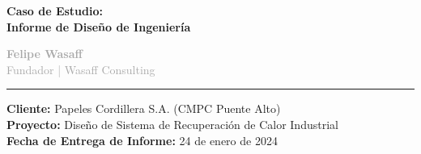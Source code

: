 \documentclass[10pt, a4paper]{article}
\begin{document}
\begin{minipage}[t]{0.65\textwidth}
    \vspace{0pt}
    \textcolor{DeepBlue}{\Huge\textbf{Caso de Estudio:}} \\
    \textcolor{OrangeAccent}{\Large\textbf{Informe de Diseño de Ingeniería}}
\end{minipage}%
\begin{minipage}[t]{0.35\textwidth}
    \vspace{0pt}
    \flushright
    \textcolor{DarkGray}{\textbf{Felipe Wasaff}} \\
    \textcolor{DarkGray}{Fundador | Wasaff Consulting}
\end{minipage}

\vspace{2mm}
\color{OrangeAccent}\rule{\linewidth}{1.5pt}
\vspace{4mm}

\noindent\begin{minipage}{\linewidth}
\large\textbf{Cliente:} Papeles Cordillera S.A. (CMPC Puente Alto) \\
\textbf{Proyecto:} Diseño de Sistema de Recuperación de Calor Industrial \\
\textbf{Fecha de Entrega de Informe:} 24 de enero de 2024
\end{minipage}

\vspace{5mm}
\end{document}

